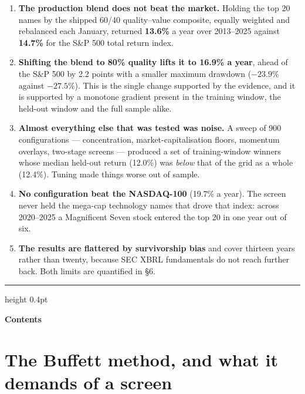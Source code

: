\documentclass[11pt,a4paper]{article}
\begin{document}
\begin{enumerate}[leftmargin=1.4em,itemsep=0.35em]
  \item \textbf{The production blend does not beat the market.} Holding the top
  20 names by the shipped 60/40 quality--value composite, equally weighted and
  rebalanced each January, returned \textbf{13.6\%} a year over 2013--2025
  against \textbf{14.7\%} for the S\&P 500 total return index.

  \item \textbf{Shifting the blend to 80\% quality lifts it to 16.9\% a year},
  ahead of the S\&P 500 by 2.2 points with a smaller maximum drawdown
  ($-23.9\%$ against $-27.5\%$). This is the single change supported by the
  evidence, and it is supported by a monotone gradient present in the training
  window, the held-out window and the full sample alike.

  \item \textbf{Almost everything else that was tested was noise.} A sweep of
  900 configurations --- concentration, market-capitalisation floors, momentum
  overlays, two-stage screens --- produced a set of training-window winners
  whose median held-out return (12.0\%) was \emph{below} that of the grid as a
  whole (12.4\%). Tuning made things worse out of sample.

  \item \textbf{No configuration beat the NASDAQ-100} (19.7\% a year). The
  screen never held the mega-cap technology names that drove that index: across
  2020--2025 a Magnificent Seven stock entered the top 20 in one year out of
  six.

  \item \textbf{The results are flattered by survivorship bias} and cover
  thirteen years rather than twenty, because SEC XBRL fundamentals do not
  reach further back. Both limits are quantified in \S6.
\end{enumerate}

\vspace{0.6em}
\hrule height 0.4pt

\clearpage
{\sffamily\large\bfseries Contents}\vspace{-1.6em}
\renewcommand{\contentsname}{}
\tableofcontents

\clearpage

\section{The Buffett method, and what it demands of a screen}
\end{document}
